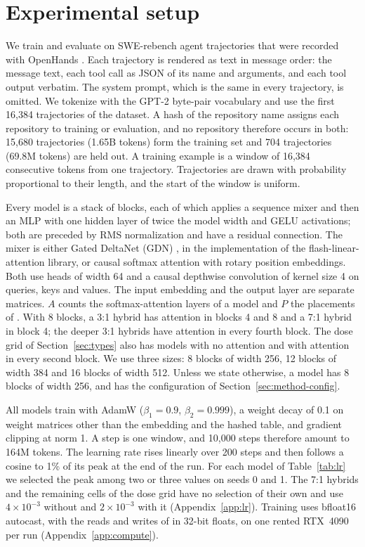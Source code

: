 \section{Experimental setup}
\label{sec:setup}

We train and evaluate on SWE-rebench agent trajectories that were recorded with OpenHands
\citep{swerebench,swerebenchtraj,openhands}. Each trajectory is rendered as text in message order: the message text, each
tool call as JSON of its name and arguments, and each tool output verbatim. The system prompt,
which is the same in every trajectory, is omitted. We tokenize with the GPT-2 byte-pair vocabulary
and use the first 16,384 trajectories of the dataset. A hash of the repository name assigns each
repository to training or evaluation, and no repository therefore occurs in both: 15,680
trajectories (1.65B tokens) form the training set and 704 trajectories (69.8M tokens) are held
out. A training example is a window of 16,384 consecutive tokens from one trajectory. Trajectories
are drawn with probability proportional to their length, and the start of the window is uniform.

Every model is a stack of blocks, each of which applies a sequence mixer and then an MLP with one
hidden layer of twice the model width and GELU activations; both are preceded by RMS normalization
and have a residual connection. The mixer is either Gated DeltaNet (GDN) \citep{yang2025gdn}, in the
implementation of the flash-linear-attention library, or causal softmax attention with rotary
position embeddings. Both use heads of width 64 and a causal depthwise convolution of kernel size
4 on queries, keys and values. The input embedding and the output layer are separate matrices. $A$ counts the
softmax-attention layers of a model and $P$ the placements of \ingram{}. With 8 blocks, a 3:1
hybrid has attention in blocks 4 and 8 and a 7:1 hybrid in block 4; the deeper 3:1 hybrids have
attention in every fourth block. The dose grid of Section~\ref{sec:types} also has models with no
attention and with attention in every second block. We use three sizes: 8 blocks of width 256, 12 blocks of width 384
and 16 blocks of width 512. Unless we state otherwise, a model has 8 blocks of width 256, and
\ingram{} has the configuration of Section~\ref{sec:method-config}.

All models train with AdamW ($\beta_1 = 0.9$, $\beta_2 = 0.999$), a weight decay of 0.1 on weight
matrices other than the embedding and the hashed table, and gradient clipping at norm 1. A step is
one window, and 10,000 steps therefore amount to 164M tokens. The learning rate rises linearly
over 200 steps and then follows a cosine to 1\% of its peak at the end of the run. For each model
of Table~\ref{tab:lr} we selected the peak among two or three values on seeds 0 and 1. The 7:1
hybrids and the remaining cells of the dose grid have no selection of their own and use
$4 \times 10^{-3}$ without \ingram{} and $2 \times 10^{-3}$ with it (Appendix~\ref{app:lr}). Training
uses bfloat16 autocast, with the reads and writes of \ingram{} in 32-bit floats, on one rented
RTX~4090 per run (Appendix~\ref{app:compute}).


